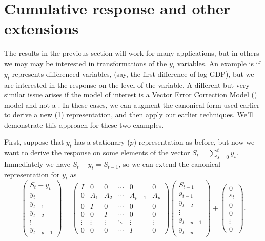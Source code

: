 \documentclass[12pt,fleqn]{article}
\newcommand{\vep}{\varepsilon}
\newcommand{\VECM}{\allcaps{VECM}}
\begin{document}
\section{Cumulative response and other extensions}

The results in the previous section will work for many applications,
but in others we may may be interested in transformations of the $y_t$
variables. An example is if $y_t$ represents differenced variables,
(say, the first difference of log GDP), but we are interested in the
response on the level of the variable. A different but very similar
issue arises if the model of interest is a Vector Error Correction
Model (\VECM) model and not a \VAR. In these cases, we can augment the
canonical form used earlier to derive a new \VAR(1) representation,
and then apply our earlier techniques. We'll demonstrate this approach
for these two examples.

First, suppose that $y_t$ has a stationary \VAR($p$) representation as
before, but now we want to derive the response on some elements of the
vector $S_t = \sum_{s=0}^t y_s$. Immediately we have $S_t - y_t =
S_{t-1}$, so we can extend the canonical representation for $y_t$ as
\begin{equation*}
  \begin{pmatrix}
    S_t - y_t \\ y_t \\ y_{t-1} \\ y_{t-2} \\ \vdots \\ y_{t-p+1}
  \end{pmatrix}
  =
  \begin{pmatrix}
    I & 0 & 0 & \cdots & 0 & 0 \\
    0 & A_1 & A_2 & \cdots & A_{p-1} & A_p \\
    0 & I   & 0 & \cdots & 0 & 0 \\
    0 & 0   & I & \cdots & 0 & 0 \\
    \vdots & \vdots & \vdots & \ddots & \vdots & \vdots \\
    0 & 0 & 0 & \cdots & I & 0
  \end{pmatrix}
  \begin{pmatrix}
    S_{t-1}  \\ y_{t-1} \\ y_{t-2} \\ \vdots \\ y_{t-p+1} \\ y_{t-p}
  \end{pmatrix}
  +
  \begin{pmatrix}
    0 \\ \vep_t \\ 0 \\ 0 \\ \vdots \\ 0
  \end{pmatrix}.
\end{equation*}
\end{document}
